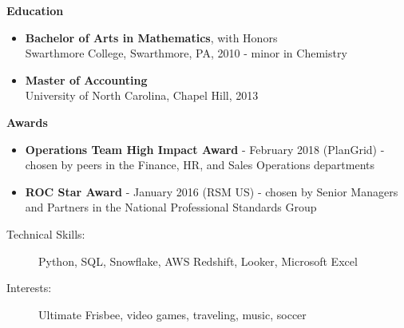 \documentclass[10pt]{article}
\begin{document}
  {\large \textbf{Education}}

  \begin{itemize}
    \item
      \textbf{Bachelor of Arts in Mathematics}, with Honors \\
      Swarthmore College, Swarthmore, PA, 2010 - minor in Chemistry \\

    \item
      \textbf{Master of Accounting} \\
      University of North Carolina, Chapel Hill, 2013 \\

  \end{itemize}

  {\large \textbf{Awards}}
  \begin{itemize}
    \item  \textbf{Operations Team High Impact Award} - February 2018 (PlanGrid) - chosen by peers in the Finance, HR, and Sales Operations departments
    \item \textbf{ROC Star Award} - January 2016 (RSM US) - chosen by Senior Managers and Partners in the National Professional Standards Group
  \end{itemize}

  \begin{description}

    \item[Technical Skills:]
Python, SQL, Snowflake, AWS Redshift, Looker, Microsoft Excel

    \item[Interests:]
Ultimate Frisbee, video games, traveling, music, soccer

  \end{description}
\end{document}
